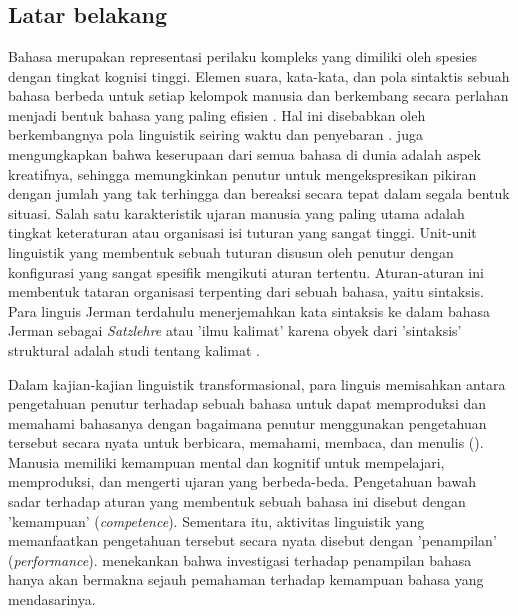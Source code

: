 
\onehalfspacing
\chapter{\babSatu}

\section{Latar belakang}
Bahasa merupakan representasi perilaku kompleks yang dimiliki oleh spesies dengan tingkat kognisi tinggi. Elemen suara, kata-kata, dan pola sintaktis sebuah bahasa berbeda untuk setiap kelompok manusia dan berkembang secara perlahan menjadi bentuk bahasa yang paling efisien \citep{aitchison2004change}. Hal ini disebabkan oleh berkembangnya pola linguistik seiring waktu dan penyebaran \citep{sapir1921intro}. \cite{chomsky1965syntactic} juga mengungkapkan bahwa keserupaan dari semua bahasa di dunia adalah aspek kreatifnya, sehingga memungkinkan penutur untuk mengekspresikan pikiran dengan jumlah yang tak terhingga dan bereaksi secara tepat dalam segala bentuk situasi. Salah satu karakteristik ujaran manusia yang paling utama adalah tingkat keteraturan atau organisasi isi tuturan yang sangat tinggi. Unit-unit linguistik yang membentuk sebuah tuturan disusun oleh penutur dengan konfigurasi yang sangat spesifik mengikuti aturan tertentu. Aturan-aturan ini membentuk tataran organisasi terpenting dari sebuah bahasa, yaitu sintaksis. Para linguis Jerman terdahulu menerjemahkan kata sintaksis ke dalam bahasa Jerman sebagai \textit{Satzlehre} atau 'ilmu kalimat' karena obyek dari 'sintaksis' struktural adalah studi tentang kalimat \citep{tesniere1959elements}.

Dalam kajian-kajian linguistik transformasional, para linguis memisahkan antara pengetahuan penutur terhadap sebuah bahasa untuk dapat memproduksi dan memahami bahasanya dengan bagaimana penutur menggunakan pengetahuan tersebut secara nyata untuk berbicara, memahami, membaca, dan menulis (\citealp{chomsky1965syntactic,delahuntygarvey2010soundsense}). Manusia memiliki kemampuan mental dan kognitif untuk mempelajari, memproduksi, dan mengerti ujaran yang berbeda-beda. Pengetahuan bawah sadar terhadap aturan yang membentuk sebuah bahasa ini disebut dengan 'kemampuan' (\textit{competence}). Sementara itu, aktivitas linguistik yang memanfaatkan pengetahuan tersebut secara nyata disebut dengan 'penampilan' (\textit{performance}). \cite{chomsky1965syntactic} menekankan bahwa investigasi terhadap penampilan bahasa hanya akan bermakna sejauh pemahaman terhadap kemampuan bahasa yang mendasarinya.

